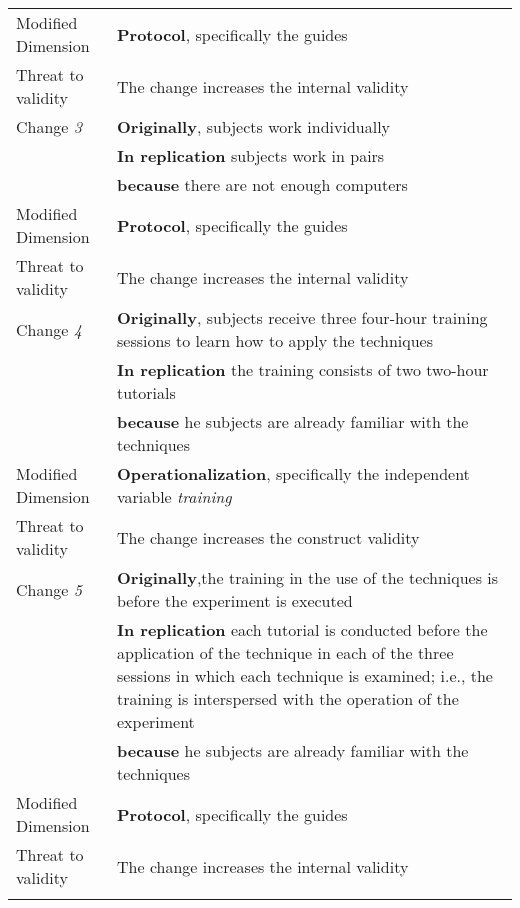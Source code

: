 \begin{table*}[h]
\begin{tabularx}{\textwidth}{
  >{\hsize=0.3\hsize}X
  >{\hsize=0.8\hsize}X}
     Modified Dimension & 
   \textbf{Protocol}, specifically the guides  \\ 
    Threat to validity & The change increases the internal validity \\  \hline
    Change \textit{3}   & \textbf{Originally}, subjects work individually \\& \textbf{In replication} subjects work in pairs \\& \textbf{because} there are not enough computers  \\
    
     Modified Dimension & 
   \textbf{Protocol}, specifically the guides  \\ 
    Threat to validity & The change increases the internal validity \\  \hline
    
    Change \textit{4}   & \textbf{Originally}, subjects receive three four-hour training sessions to learn how to apply the techniques   \\& \textbf{In replication} the training consists of two two-hour tutorials \\& \textbf{because} he subjects are already familiar with the techniques \\

    Modified Dimension & 
   \textbf{Operationalization}, specifically the independent variable  \textit {training} \\ 
    Threat to validity & The change increases the construct validity \\ \hline
    
    Change \textit{5}   & \textbf{Originally},the training in the use of the techniques is before the experiment is executed \\& \textbf{In replication} each tutorial is conducted before the application of the technique in each of the three sessions in which each technique is examined; i.e., the training is interspersed with the operation of the experiment \\& \textbf{because} he subjects are already familiar with the techniques \\

     Modified Dimension & 
   \textbf{Protocol}, specifically the guides   \\
     Threat to validity & The change increases the internal validity  \\ 
   
   \noalign{\smallskip\smallskip}\hline
   	\end{tabularx}  
	
\end{table*}